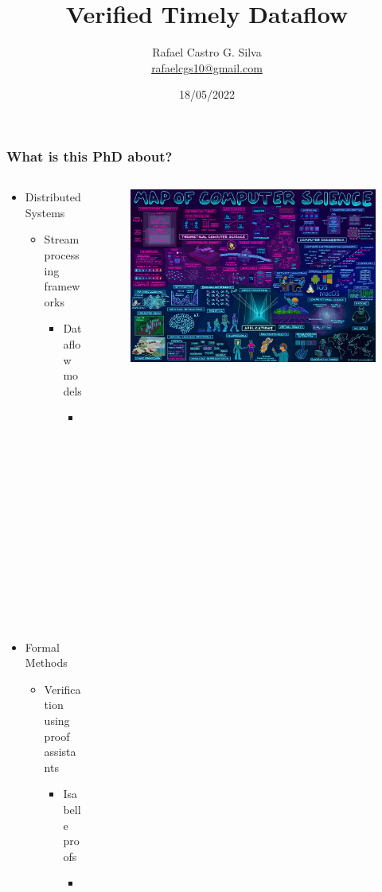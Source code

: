 \documentclass[aspectratio=169,10pt]{beamer}
\title[Verified Timely Dataflow]{Verified Timely Dataflow}
\author[Rafael Castro]{
  Rafael Castro G. Silva\\\medskip
  {\small \url{rafaelcgs10@gmail.com}}}
\date{18/05/2022}
\institute[UCPH]{
  Department of Computer Science \\
  University of Copenhagen}
\begin{document}
\begin{frame}
  \titlepage

\end{frame}

\begin{frame}[fragile]
  \frametitle{What is this PhD about?}
  \begin{columns}
    \begin{column}{0.45\textwidth}
      \begin{itemize}
        \item Distributed Systems
              \begin{itemize}
                \item Stream processing frameworks
                      \begin{itemize}
                        \item Dataflow models
                              \begin{itemize}
                                \item Timely Dataflow
                              \end{itemize}
                      \end{itemize}
              \end{itemize}
        \item Formal Methods
              \begin{itemize}
                \item Verification using proof assistants
                      \begin{itemize}
                        \item Isabelle proofs
                              \begin{itemize}
                                \item Verified and executable code
                              \end{itemize}
                      \end{itemize}
              \end{itemize}
      \end{itemize}
    \end{column}
    \begin{column}{0.55\textwidth}
      \begin{figure}
      \includegraphics[width=1\textwidth]{map.jpg}

\end{figure}
\end{column}
\end{columns}
\end{frame}
\end{document}
